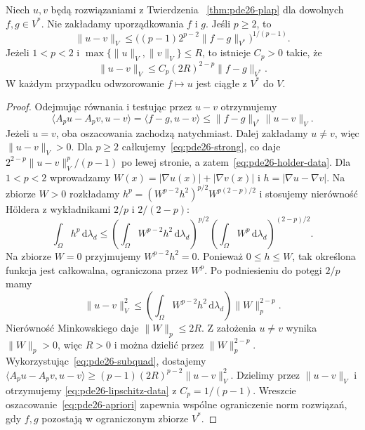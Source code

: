 \begin{twierdzenie}\label{thm:pde26-stability}
Niech $u,v$ będą rozwiązaniami z Twierdzenia
~\ref{thm:pde26-plap} dla dowolnych $f,g\in V^*$.
Nie zakładamy uporządkowania $f$ i $g$.
Jeśli $p\ge2$, to
\begin{equation}\label{eq:pde26-holder-data}
 \|u-v\|_V\le
 \bigl((p-1)2^{p-2}\|f-g\|_{V^*}\bigr)^{1/(p-1)}.
\end{equation}
Jeżeli $1<p<2$ i $\max\{\|u\|_V,\|v\|_V\}\le R$,
to istnieje $C_p>0$ takie, że
\begin{equation}\label{eq:pde26-lipschitz-data}
 \|u-v\|_V\le C_p(2R)^{2-p}\|f-g\|_{V^*}.
\end{equation}
W każdym przypadku odwzorowanie $f\mapsto u$
jest ciągłe z $V^*$ do $V$.
\end{twierdzenie}
\begin{proof}
Odejmując równania i testując przez $u-v$ otrzymujemy
\[
 \langle A_pu-A_pv,u-v\rangle
 =\langle f-g,u-v\rangle
 \le\|f-g\|_{V^*}\|u-v\|_V.
\]
Jeżeli $u=v$, oba oszacowania zachodzą natychmiast.
Dalej zakładamy $u\ne v$, więc $\|u-v\|_V>0$.
Dla $p\ge2$ całkujemy~\eqref{eq:pde26-strong},
co daje $2^{2-p}\|u-v\|_V^p/(p-1)$ po lewej stronie,
a zatem~\eqref{eq:pde26-holder-data}.
Dla $1<p<2$ wprowadzamy
$W(x)=|\nabla u(x)|+|\nabla v(x)|$ i
$h=|\nabla u-\nabla v|$. Na zbiorze $W>0$ rozkładamy
$h^p=(W^{p-2}h^2)^{p/2}W^{p(2-p)/2}$
i stosujemy nierówność Höldera z wykładnikami
$2/p$ i $2/(2-p)$:
\[
 \int_\Omega h^p\,\mathrm d\lambda_d
 \le \left(\int_\Omega W^{p-2}h^2\,\mathrm d\lambda_d\right)^{p/2}
 \left(\int_\Omega W^p\,\mathrm d\lambda_d\right)^{(2-p)/2}.
\]
Na zbiorze $W=0$ przyjmujemy $W^{p-2}h^2=0$.
Ponieważ $0\le h\le W$, tak określona funkcja jest
całkowalna, ograniczona przez $W^p$.
Po podniesieniu do potęgi $2/p$ mamy
\[
 \|u-v\|_V^2
 \le \left(\int_\Omega W^{p-2}h^2\,\mathrm d\lambda_d\right)
       \|W\|_p^{2-p}.
\]
Nierówność Minkowskiego daje $\|W\|_p\le2R$.
Z założenia $u\ne v$ wynika $\|W\|_p>0$, więc
$R>0$ i można dzielić przez $\|W\|_p^{2-p}$.
Wykorzystując~\eqref{eq:pde26-subquad}, dostajemy
$\langle A_pu-A_pv,u-v\rangle
\ge(p-1)(2R)^{p-2}\|u-v\|_V^2$.
Dzielimy przez $\|u-v\|_V$ i otrzymujemy
\eqref{eq:pde26-lipschitz-data} z $C_p=1/(p-1)$.
Wreszcie oszacowanie~\eqref{eq:pde26-apriori} zapewnia
wspólne ograniczenie norm rozwiązań, gdy $f,g$
pozostają w ograniczonym zbiorze $V^*$.
\end{proof}

